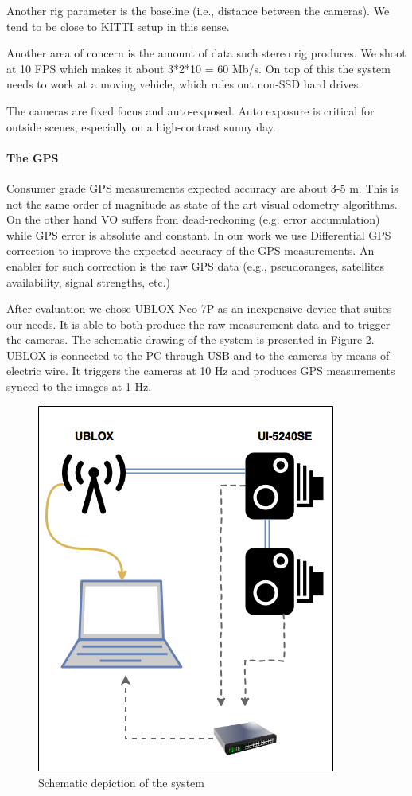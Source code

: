\documentclass{report}
\begin{document}
Another rig parameter is the baseline (i.e., distance between the
cameras).  We tend to be close to KITTI setup in this sense.

Another area of concern is the amount of data such stereo rig
produces.  We shoot at 10 FPS which makes it about 3*2*10 = 60 Mb/s.
On top of this the system needs to work at a moving vehicle, which
rules out non-SSD hard drives.

The cameras are fixed focus and auto-exposed.  Auto exposure is
critical for outside scenes, especially on a high-contrast sunny day.

\paragraph{The GPS} Consumer grade GPS measurements expected accuracy
are about 3-5 m. This is not the same order of magnitude as state of
the art visual odometry algorithms.  On the other hand VO suffers from
dead-reckoning (e.g. error accumulation) while GPS error is absolute
and constant.  In our work we use Differential GPS correction to
improve the expected accuracy of the GPS measurements.  An enabler for
such correction is the raw GPS data (e.g., pseudoranges, satellites
availability, signal strengths, etc.)

After evaluation we chose UBLOX Neo-7P as an inexpensive device that
suites our needs.  It is able to both produce the raw measurement data
and to trigger the cameras.  The schematic drawing of the system is
presented in Figure 2.  UBLOX is connected to the PC through USB and
to the cameras by means of electric wire.  It triggers the cameras at
10 Hz and produces GPS measurements synced to the images at 1 Hz.

\begin{figure}[h]
\centering
\includegraphics[width=.5\textwidth]{schema}
\caption{Schematic depiction of the system}
\end{figure}
\end{document}
